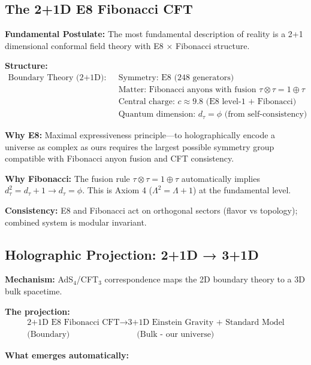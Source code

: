 \documentclass[11pt]{article}
\theoremstyle{definition}
\newcommand{\goldenratio}{\phi}
\begin{document}
\subsection{The 2+1D E8 Fibonacci CFT}

\textbf{Fundamental Postulate:} The most fundamental description of reality is a 2+1 dimensional conformal field theory with E8 × Fibonacci structure.

\textbf{Structure:}
\begin{align}
\text{Boundary Theory (2+1D):} \quad & \text{Symmetry: E8 (248 generators)} \\
& \text{Matter: Fibonacci anyons with fusion } \tau \otimes \tau = 1 \oplus \tau \\
& \text{Central charge: } c \approx 9.8 \text{ (E8 level-1 + Fibonacci)} \\
& \text{Quantum dimension: } d_\tau = \goldenratio \text{ (from self-consistency)}
\end{align}

\textbf{Why E8:} Maximal expressiveness principle—to holographically encode a universe as complex as ours requires the largest possible symmetry group compatible with Fibonacci anyon fusion and CFT consistency.

\textbf{Why Fibonacci:} The fusion rule $\tau \otimes \tau = 1 \oplus \tau$ automatically implies $d_\tau^2 = d_\tau + 1 \rightarrow d_\tau = \goldenratio$. This is Axiom 4 ($\Lambda^2 = \Lambda + 1$) at the fundamental level.

\textbf{Consistency:} E8 and Fibonacci act on orthogonal sectors (flavor vs topology); combined system is modular invariant.

\subsection{Holographic Projection: 2+1D → 3+1D}

\textbf{Mechanism:} AdS$_4$/CFT$_3$ correspondence maps the 2D boundary theory to a 3D bulk spacetime.

\textbf{The projection:}
\begin{align}
\text{2+1D E8 Fibonacci CFT} \rightarrow \text{3+1D Einstein Gravity + Standard Model} \\
\text{(Boundary)} \quad \quad \quad \quad \quad \quad \quad \quad \text{(Bulk - our universe)}
\end{align}

\textbf{What emerges automatically:}
\end{document}
